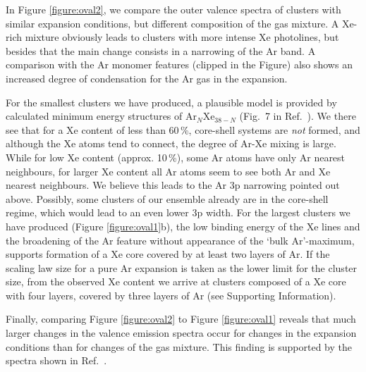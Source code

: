 In Figure \ref{figure:oval2}, we compare the outer valence spectra of clusters with similar expansion conditions, but different composition of the gas mixture.
A Xe-rich mixture obviously leads to clusters with more intense Xe photolines, but besides that the main change consists in a narrowing of the Ar band.
A comparison with the Ar monomer features (clipped in the Figure) also shows an increased degree of condensation for the Ar gas in the expansion.

For the smallest clusters we have produced, a plausible model is provided by calculated minimum energy structures of Ar$_N$Xe$_{38-N}$ (Fig.\ 7 in Ref.\ \cite{marques}).
We there see that for a Xe content of less than 60\,\%, core-shell systems are {\it not} formed, and although the Xe atoms tend to connect, the degree of Ar-Xe mixing is large.
While for low Xe content (approx. 10\,\%), some Ar atoms have only Ar nearest neighbours, for larger Xe content all Ar atoms seem to see both Ar and Xe nearest neighbours.
We believe this leads to the Ar 3p narrowing pointed out above.
Possibly, some clusters of our ensemble already are in the core-shell regime, which would lead to an even lower 3p width.
{\color{red}{Falsch. Für core-shell Strukturen müsste der Peak wieder breiter sein,
 da es dann wieder Argon Atome ohne Xenonnachbarn gibt (zumindest bei mehr als
 einer Argonschicht).}}
For the largest clusters we have produced (Figure \ref{figure:oval1}b), the low binding energy of the Xe lines and the broadening of the Ar feature without appearance of the `bulk Ar'-maximum, supports formation of a Xe core covered by at least two layers of Ar.
If the scaling law size for a pure Ar expansion is taken as the lower limit for the cluster size, from the observed Xe content we arrive at clusters composed of a Xe core with four layers, covered by three layers of Ar (see Supporting Information).
{\color{red}{Dann sollten wir zumindest diesen Fall auch berechnen. Meinst du
$c=4$ oder 4 Schichten um ein Atom? -> Fehlt auch noch in supporting information}}

Finally, comparing Figure \ref{figure:oval2} to Figure \ref{figure:oval1} reveals
that much larger changes in the valence emission spectra occur for changes in
the expansion conditions than for changes of the gas mixture.
This finding is supported by the spectra shown in Ref.\ \cite{lindblad}.
%
%
